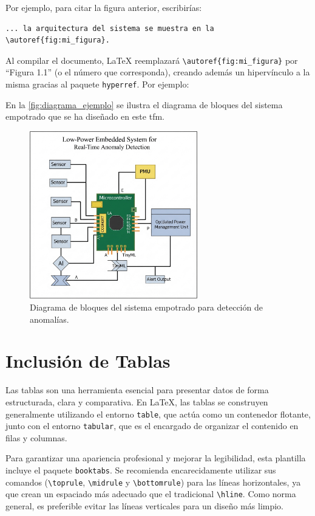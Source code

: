 \documentclass[11pt,a4paper]{book}
\begin{document}
Por ejemplo, para citar la figura anterior, escribirías:
\begin{verbatim}
... la arquitectura del sistema se muestra en la \autoref{fig:mi_figura}.
\end{verbatim}

Al compilar el documento, LaTeX reemplazará \verb|\autoref{fig:mi_figura}| por ``Figura 1.1'' (o el número que corresponda), creando además un hipervínculo a la misma gracias al paquete \texttt{hyperref}. Por ejemplo:

En la \autoref{fig:diagrama_ejemplo} se ilustra el diagrama de bloques del sistema empotrado que se ha diseñado en este \gls{tfm}.

\begin{figure}
    \centering
    \includegraphics[width=0.65\textwidth]{fig/diagrama_sistema_ejemplo.png}
    \caption{Diagrama de bloques del sistema empotrado para detección de anomalías.}
    \label{fig:diagrama_ejemplo}
\end{figure}

\section{Inclusión de Tablas}
\label{sec:tablas}

Las tablas son una herramienta esencial para presentar datos de forma estructurada, clara y comparativa. En \LaTeX{}, las tablas se construyen generalmente utilizando el entorno \texttt{table}, que actúa como un contenedor flotante, junto con el entorno \texttt{tabular}, que es el encargado de organizar el contenido en filas y columnas.

Para garantizar una apariencia profesional y mejorar la legibilidad, esta plantilla incluye el paquete \texttt{booktabs}. Se recomienda encarecidamente utilizar sus comandos (\verb|\toprule|, \verb|\midrule| y \verb|\bottomrule|) para las líneas horizontales, ya que crean un espaciado más adecuado que el tradicional \verb|\hline|. Como norma general, es preferible evitar las líneas verticales para un diseño más limpio.
\end{document}
